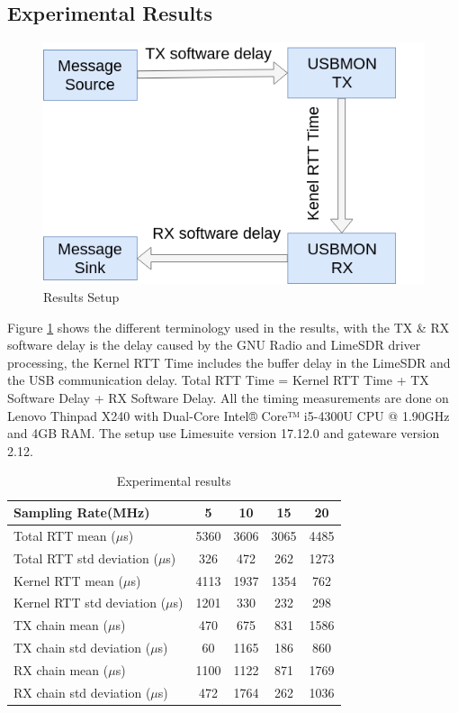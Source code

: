 \documentclass{kththesis}
\begin{document}
\subsection{Experimental Results}
\begin{figure}
\centering
\includegraphics[scale=0.5]{results_setup.png}
\caption{Results Setup}
\label{res_set}
\end{figure}
Figure \ref{res_set} shows the different terminology used in the results, with the TX \& RX software delay is the delay caused by the GNU Radio and LimeSDR driver processing, the Kernel RTT Time includes the buffer delay in the LimeSDR and the USB communication delay. Total RTT Time = Kernel RTT Time + TX Software Delay + RX Software Delay. All the timing measurements are done on Lenovo Thinpad X240 with Dual-Core Intel® Core™ i5-4300U CPU @ 1.90GHz and 4GB RAM. The setup use Limesuite version 17.12.0 and gateware version 2.12.
\begin{table}
\centering
\label{res}
\begin{tabular}{|l|c|c|c|c|}
\hline
Sampling Rate(MHz)                                                  & 5    & 10   & 15   & 20   \\
\hline
Total RTT mean ($\mu$s)                                                      & 5360 & 3606 & 3065 & 4485 \\ \hline
Total RTT std deviation ($\mu$s)   & 326  & 472  & 262  & 1273 \\ \hline
Kernel RTT mean ($\mu$s)                                                     & 4113 & 1937 & 1354 & 762  \\ \hline
Kernel RTT std deviation ($\mu$s) & 1201 & 330  & 232  & 298  \\ \hline
TX chain mean ($\mu$s)                                                       & 470  & 675  & 831  & 1586 \\ \hline
TX chain std deviation ($\mu$s)    & 60   & 1165 & 186  & 860  \\ \hline
RX chain mean ($\mu$s)                                                       & 1100 & 1122 & 871  & 1769 \\ \hline
RX chain std deviation ($\mu$s)                                              & 472  & 1764 & 262  & 1036\\ \hline
\end{tabular}
\caption{Experimental results}
\end{table}
\end{document}
